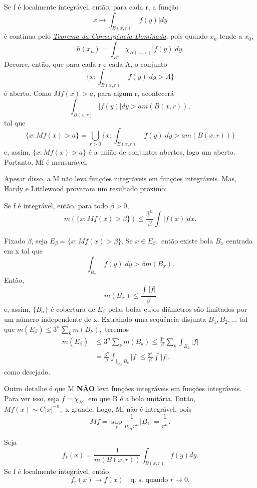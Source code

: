 \documentclass[measure_theory.tex]{subfiles}
\begin{document}
Se f é localmente integrável, então, para cada r, a função
\[
	x\mapsto \int_{B(x, r)}|f(y)| dy
\]
é contínua pelo \hyperlink{dominated_convergence}{\textit{Teorema da Convergência Dominada}}, pois quando \(x_{n}\) tende a \(x_{0}\),
\[
	h(x_{n}) = \int_{R^{n}}\chi_{B(x_{n}, r)}|f(y)| dy.
\]
Decorre, então, que para cada r e cada A, o conjunto
\[
	\biggl\{x: \int_{B(x, r)}|f(y)| dy  > A\biggr\}
\]
é aberto. Como \(Mf(x) > a\), para algum r, acontecerá
\[
	\int_{B(x, r)}|f(y)| dy > am(B(x, r)),
\]
tal que
\[
	\{x: Mf(x) > a\} = \bigcup_{r>0}^{}\biggl\{x: \int_{B(x, r)}|f(y)| dy > am(B(x, r))\biggr\}
\]
e, assim, \(\{x: Mf(x) > a\}\) é a união de conjuntos abertos, logo um aberto. Portanto, Mf é mensurável.

Apesar disso, a M não leva funções integráveis em funções integráveis. Mas, Hardy e Littlewood provaram um resultado próximo:
\begin{theorem*}
	Se f é integrável, então, para todo \(\beta > 0,\)
	\[
		m(\{x: Mf(x) > \beta \})\leq \frac{3^{n}}{\beta }\int_{}^{}|f(x)|dx.
	\]
\end{theorem*}
\begin{proof*}
	Fixado \(\beta \), seja \(E_{\beta } = \{x: Mf(x) > \beta \}.\) Se \(x\in E_{\beta },\) então existe bola \(B_{x}\) centrada em x tal que
	\[
		\int_{B_{x}}|f(y)| dy > \beta m (B_{x}).
	\]
	Então,
	\[
		m(B_{x}) \leq \frac{\int_{}^{}|f|}{\beta }
	\]
	e, assim, \(\{B_{\alpha }\}\) é cobertura de \(E_{\beta }\) pelas bolas cujos diâmetros são limitados por um número independente de x. Extraindo uma sequência disjunta \(B_{1}, B_2, \dotsc \) tal que \(m(E_{\beta }) \leq 3^{n}\sum\limits_{k}^{}m(B_{k}),\) teremos
	\begin{align*}
		m(E_{\beta }) & \leq 3^{n}\sum\limits_{k}^{}m(B_{k}) \leq \frac{3^{n}}{\beta }\sum\limits_{k}^{}\int_{B_{k}}|f| \\
		              & = \frac{3^{n}}{\beta }\int_{\bigcup_{k}^{}B_{k}}|f| \leq \frac{3^{n}}{\beta }\int_{}^{}|f|,
	\end{align*}
	como desejado. \qedsymbol
\end{proof*}
\begin{example}
	Outro detalhe é que M \textbf{NÃO} leva funções integráveis em funções integráveis. Para ver isso, seja \(f = \chi_{B},\) em que B é a bola unitária. Então, \(Mf(x)\sim C|x|^{-n},\) x grande. Logo, Mf não é integrável, pois
	\[
		Mf = \sup_{r}\frac{1}{w_{n}r^{n}}|B_1| = \frac{1}{r^{n}}.
	\]
\end{example}
\begin{theorem*}
	Seja
	\[
		f_{r}(x) = \frac{1}{m(B(x, r))}\int_{B(x, r)}f(y)dy.
	\]
	Se f é localmente integrável, então
	\[
		f_{r}(x)\to f(x)\quad \text{q. s. quando }r\to 0.
	\]
\end{theorem*}
\end{document}

